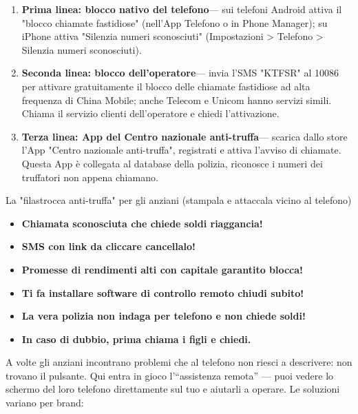 
\begin{enumerate}
  \item \textbf{Prima linea: blocco nativo del telefono}— sui telefoni Android attiva il "blocco chiamate fastidiose" (nell'App Telefono o in Phone Manager); su iPhone attiva "Silenzia numeri sconosciuti" (Impostazioni > Telefono > Silenzia numeri sconosciuti).
  \item \textbf{Seconda linea: blocco dell'operatore}— invia l'SMS "KTFSR" al 10086 per attivare gratuitamente il blocco delle chiamate fastidiose ad alta frequenza di China Mobile; anche Telecom e Unicom hanno servizi simili. Chiama il servizio clienti dell'operatore e chiedi l'attivazione.
  \item \textbf{Terza linea: App del Centro nazionale anti-truffa}— scarica dallo store l'App "Centro nazionale anti-truffa", registrati e attiva l'avviso di chiamate. Questa App è collegata al database della polizia, riconosce i numeri dei truffatori non appena chiamano.
\end{enumerate}

\begin{tcbwarn}{La "filastrocca anti-truffa" per gli anziani (stampala e attaccala vicino al telefono)}
\begin{itemize}
  \item \textbf{Chiamata sconosciuta che chiede soldi riaggancia!}
  \item \textbf{SMS con link da cliccare cancellalo!}
  \item \textbf{Promesse di rendimenti alti con capitale garantito blocca!}
  \item \textbf{Ti fa installare software di controllo remoto chiudi subito!}
  \item \textbf{La vera polizia non indaga per telefono e non chiede soldi!}
  \item \textbf{In caso di dubbio, prima chiama i figli e chiedi.}
\end{itemize}

\end{tcbwarn}


A volte gli anziani incontrano problemi che al telefono non riesci a descrivere: non trovano il pulsante. Qui entra in gioco l'“assistenza remota” — puoi vedere lo schermo del loro telefono direttamente sul tuo e aiutarli a operare. Le soluzioni variano per brand:

